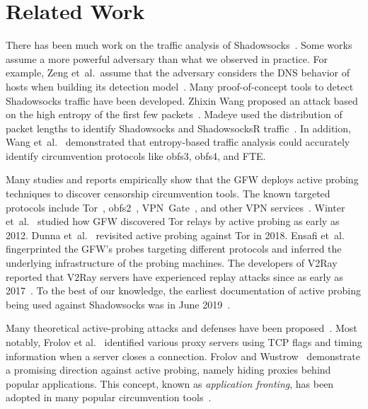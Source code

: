 \documentclass[sigconf,letterpaper]{acmart}
\begin{document}
\section{Related Work}
\label{sec:related-work}

There has been much work on the traffic analysis of Shadowsocks~\cite{Deng2017a, 8067534, LIU201983, zhao2018revisiting, 8676111, baertsmultipath}.
Some works assume a more powerful adversary than what we observed in practice.
For example, Zeng et~al.\ assume that the adversary considers the DNS behavior of hosts when building its detection model~\cite{8676111}.
Many proof-of-concept tools to detect Shadowsocks traffic have been developed.
Zhixin Wang proposed an attack based on the high entropy of the first few packets~\cite{isofew}.
Madeye used the distribution of packet lengths to identify Shadowsocks and ShadowsocksR traffic~\cite{madeye}.
In addition,
Wang et~al.~\cite[\S 5]{Wang2015a} demonstrated that entropy-based traffic analysis could accurately identify circumvention protocols like obfs3, obfs4, and FTE.

Many studies and reports empirically show that the GFW deploys active probing techniques to discover censorship circumvention tools.
The known targeted protocols include
Tor~\cite{knock-knock-tor, Dunna2018a, Winter2012a}, obfs2~\cite{Winter-obfs2-probe},
VPN~Gate~\cite{Nobori2014a}, and other VPN services~\cite{AndrewJacobs}.
Winter et~al.~\cite{Winter2012a} studied how GFW discovered Tor relays by active probing as early as 2012.
Dunna et~al.~\cite{Dunna2018a} revisited active probing against Tor in 2018.
Ensafi et~al.~\cite{Ensafi2015b} fingerprinted the GFW's probes targeting different protocols and inferred the underlying infrastructure of the probing machines.
The developers of V2Ray reported that V2Ray servers have experienced replay attacks since as early as 2017~\cite{v2ray-replay-discover}.
To the best of our knowledge,
the earliest documentation of active probing being used against Shadowsocks was in June 2019~\cite{ss-replay-discover}.

Many theoretical active-probing attacks and defenses have been proposed~\cite{BreakWa112015, printempw2017, Fifield2017-summary, Peng2020Redirect, cheng2020acer, v2ray-replay-summary, v2ray-replay-1, v2ray-replay-2}.
Most notably,
Frolov et al.~\cite{Frolov2020a} identified various proxy servers
using TCP flags and timing information when a server closes a connection.
Frolov and Wustrow~\cite{Frolov2020b} demonstrate a promising direction against active probing, namely hiding proxies behind popular applications.
This concept,
known as \emph{application fronting},
has been adopted in many popular circumvention tools~\cite{naiveproxy, forwardproxy, v2ray, trojan}.
\end{document}
